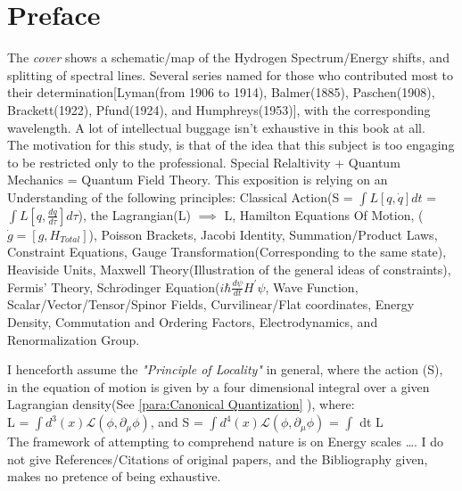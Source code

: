 \documentclass[a4paper, 10pt, onepage]{elegantbook}
\begin{document}
\newpage

\section{Preface}


The \emph{cover} shows  a schematic/map of the Hydrogen Spectrum/Energy shifts, and splitting of spectral lines. Several series named for those who contributed most to their determination[Lyman(from 1906 to 1914), Balmer(1885), Paschen(1908), Brackett(1922), Pfund(1924), and Humphreys(1953)], with the corresponding wavelength. A lot of intellectual buggage isn't exhaustive in this book at all. \\

 The motivation for this study, is that of the idea that this subject is too engaging to be restricted only to the professional. Special Relaltivity + Quantum Mechanics = Quantum Field Theory. This exposition is relying on an Understanding of the following principles: Classical Action(S = $\int L [q,\dot{q}] dt$ = $\int L [q, \frac{dq}{d\tau}] d\tau$), the Lagrangian(L) $\implies$ L, Hamilton Equations Of Motion, ($\dot{g} = [g, H_{Total}]$), Poisson Brackets, Jacobi Identity, Summation/Product Laws, Constraint Equations, Gauge Transformation(Corresponding to the same state), Heaviside Units, Maxwell Theory(Illustration of the general ideas of constraints), Fermis' Theory, Schr$\ddot{o}$dinger Equation($i \hbar \frac{d \psi}{dt} H^\prime \psi$, Wave Function, Scalar/Vector/Tensor/Spinor Fields, Curvilinear/Flat coordinates, Energy Density, Commutation and Ordering Factors, Electrodynamics, and Renormalization Group.

  I henceforth assume the \emph{"Principle of Locality"} in general, where the action (S), in the equation of motion is given by a four dimensional integral over a given Lagrangian density(See \ref{para:Canonical Quantization} ), where:  \\

L = $\int d^3 (x) \mathcal{L}(\phi, \partial_\mu \phi)$, and S = $\int d^4 (x) \mathcal{L} (\phi, \partial_\mu \phi)$ = $\int$ dt L  \\


The framework of attempting to comprehend nature is on Energy scales \ldots. I do not give References/Citations of original papers, and the Bibliography given, makes no pretence of being exhaustive.
\end{document}
